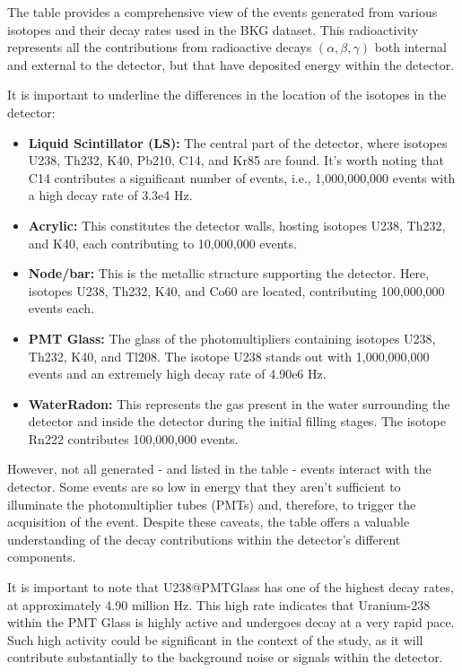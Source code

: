 The table provides a comprehensive view of the events generated from various isotopes and their decay rates used in the BKG dataset. This radioactivity represents all the contributions from radioactive decays $(\alpha, \beta, \gamma)$ both internal and external to the detector, but that have deposited energy within the detector.

It is important to underline the differences in the location of the isotopes in the detector:

\begin{itemize}
	\item \textbf{Liquid Scintillator (LS):} The central part of the detector, where isotopes U238, Th232, K40, Pb210, C14, and Kr85 are found. It's worth noting that C14 contributes a significant number of events, i.e., 1,000,000,000 events with a high decay rate of 3.3e4 Hz.
	\item \textbf{Acrylic:} This constitutes the detector walls, hosting isotopes U238, Th232, and K40, each contributing to 10,000,000 events.
	\item \textbf{Node/bar:} This is the metallic structure supporting the detector. Here, isotopes U238, Th232, K40, and Co60 are located, contributing 100,000,000 events each.
	\item \textbf{PMT Glass:} The glass of the photomultipliers containing isotopes U238, Th232, K40, and Tl208. The isotope U238 stands out with 1,000,000,000 events and an extremely high decay rate of 4.90e6 Hz.
	\item \textbf{WaterRadon:} This represents the gas present in the water surrounding the detector and inside the detector during the initial filling stages. The isotope Rn222 contributes 100,000,000 events.
\end{itemize}

However, not all generated - and listed in the table - events interact with the detector. Some events are so low in energy that they aren't sufficient to illuminate the photomultiplier tubes (PMTs) and, therefore, to trigger the acquisition of the event. Despite these caveats, the table offers a valuable understanding of the decay contributions within the detector's different components.

It is important to note that U238@PMTGlass has one of the highest decay rates, at approximately 4.90 million Hz. This high rate indicates that Uranium-238 within the PMT Glass is highly active and undergoes decay at a very rapid pace. Such high activity could be significant in the context of the study, as it will contribute substantially to the background noise or signals within the detector.


